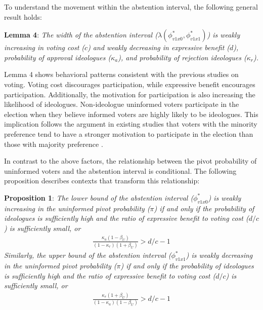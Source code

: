 \documentclass[letterpaper, 12pt]{article}
\begin{document}
    \par To understand the movement within the abstention interval, the following general result holds: 
    
    \noindent \textbf{Lemma 4}: \textit{The width of the abstention interval ($\lambda(\phi^*_{v1x0},  \phi^*_{v1x1})$) is weakly increasing in voting cost ($c$) and weakly decreasing in expressive benefit ($d$), probability of approval ideologues ($\kappa_a$), and probability of rejection ideologues ($\kappa_r$).}
    
    \noindent Lemma 4 shows behavioral patterns consistent with the previous studies on voting. Voting cost discourages participation, while expressive benefit encourages participation. Additionally, the motivation for participation is also increasing the likelihood of ideologues. Non-ideologue uninformed voters participate in the election when they believe informed voters are highly likely to be ideologues. This implication follows the argument in existing studies that voters with the minority preference tend to have a stronger motivation to participate in the election than those with majority preference \citep{Taylor2010puin, Cantoni2019pras}.
    
    \par In contrast to the above factors, the relationship between the pivot probability of uninformed voters and the abstention interval is conditional. The following proposition describes contexts that transform this relationship:
    
    \noindent \textbf{Proposition 1}: \textit{The lower bound of the abstention interval ($\phi^*_{v1x0}$) is weakly increasing in the uninformed pivot probability ($\pi$) if and only if the probability of ideologues is sufficiently high and the ratio of expressive benefit to voting cost ($d/c$) is sufficiently small, or}
    \begin{align}
    \frac{\kappa_{a} (1 - \beta_U)}{(1-\kappa_{r})(1+\beta_U)} > d/c - 1 \label{ecc1}
    \end{align}  
    \noindent \textit{Similarly, the upper bound of the abstention interval ($\phi^*_{v1x1}$) is weakly decreasing in the uninformed pivot probability ($\pi$) if and only if the probability of ideologues is sufficiently high and the ratio of expressive benefit to voting cost ($d/c$) is sufficiently small, or}
    \begin{align}
    \frac{\kappa_{r} (1 + \beta_U)}{(1-\kappa_{a})(1-\beta_U)} > d/c - 1 \label{ecc2}
    \end{align}
    
\end{document}
